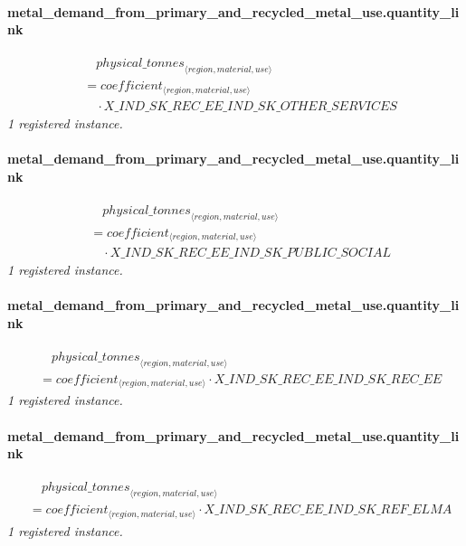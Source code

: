 \documentclass[11pt]{article}
\begin{document}
\paragraph{metal\_demand\_from\_primary\_and\_recycled\_metal\_use.quantity\_link}
\begin{align*}
&\quad {physical\_tonnes}_{\langle region, material, use\rangle}\\
&= coefficient_{\langle region, material, use\rangle}\\
&\quad {}\cdot X\_IND\_SK\_REC\_EE\_IND\_SK\_OTHER\_SERVICES
\end{align*}
\noindent\emph{1 registered instance.}\par
\paragraph{metal\_demand\_from\_primary\_and\_recycled\_metal\_use.quantity\_link}
\begin{align*}
&\quad {physical\_tonnes}_{\langle region, material, use\rangle}\\
&= coefficient_{\langle region, material, use\rangle}\\
&\quad {}\cdot X\_IND\_SK\_REC\_EE\_IND\_SK\_PUBLIC\_SOCIAL
\end{align*}
\noindent\emph{1 registered instance.}\par
\paragraph{metal\_demand\_from\_primary\_and\_recycled\_metal\_use.quantity\_link}
\begin{align*}
&\quad {physical\_tonnes}_{\langle region, material, use\rangle}\\
&= coefficient_{\langle region, material, use\rangle} \cdot X\_IND\_SK\_REC\_EE\_IND\_SK\_REC\_EE
\end{align*}
\noindent\emph{1 registered instance.}\par
\paragraph{metal\_demand\_from\_primary\_and\_recycled\_metal\_use.quantity\_link}
\begin{align*}
&\quad {physical\_tonnes}_{\langle region, material, use\rangle}\\
&= coefficient_{\langle region, material, use\rangle} \cdot X\_IND\_SK\_REC\_EE\_IND\_SK\_REF\_ELMA
\end{align*}
\noindent\emph{1 registered instance.}\par
\end{document}
